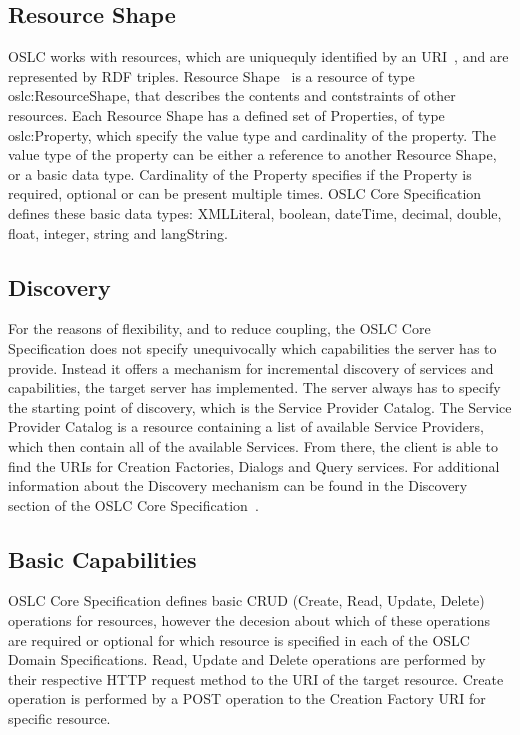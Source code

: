 \subsection*{Resource Shape}
OSLC works with resources, which are uniquequly identified by an URI \cite{uri_rfc}, and are represented by RDF triples. Resource Shape \cite{oslc_core_resource_shape} is a resource of type oslc:ResourceShape, that describes the contents and contstraints of other resources.
Each Resource Shape has a defined set of Properties, of type oslc:Property, which specify the value type and cardinality of the property. The value type of the property can be either a reference to another Resource Shape, or a basic data type. Cardinality of the Property specifies if the Property is required, optional or can be present multiple times. OSLC Core Specification defines these basic data types: XMLLiteral, boolean, dateTime, decimal, double, float, integer, string and langString.

\subsection*{Discovery}
For the reasons of flexibility, and to reduce coupling, the OSLC Core Specification does not specify unequivocally which capabilities the server has to provide. Instead it offers a mechanism for incremental discovery of services and capabilities, the target server has implemented.
The server always has to specify the starting point of discovery, which is the Service Provider Catalog. The Service Provider Catalog is a resource containing a list of available Service Providers, which then contain all of the available Services. From there, the client is able to find the URIs for Creation Factories, Dialogs and Query services. For additional information about the Discovery mechanism can be found in the Discovery section of the OSLC Core Specification \cite{oslc_core_discovery}.

\subsection*{Basic Capabilities}
OSLC Core Specification defines basic CRUD (Create, Read, Update, Delete) operations for resources, however the decesion about which of these operations are required or optional for which resource is specified in each of the OSLC Domain Specifications. Read, Update and Delete operations are performed by their respective HTTP request method to the URI of the target resource. Create operation is performed by a POST operation to the Creation Factory URI for specific resource. 

